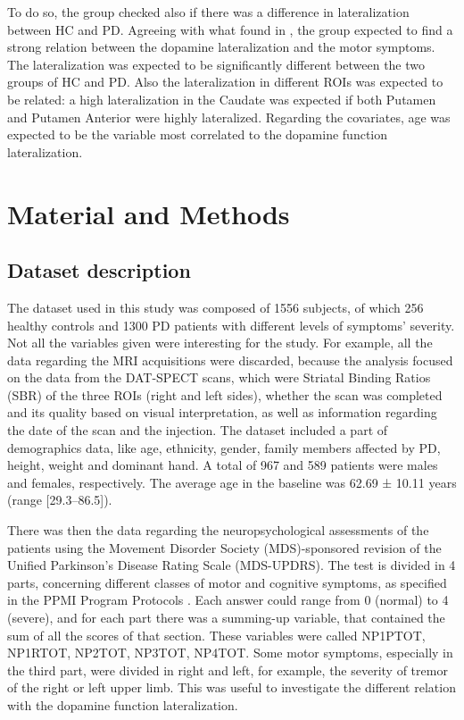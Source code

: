 \documentclass[]{article}
\begin{document}
\begin{multicols}{2}
To do so, the group checked also if there was a difference in lateralization between HC and PD. 
\newline
Agreeing with what found in \cite{pirker_correlation_2003}, the group expected to find a strong relation between the dopamine lateralization and the motor symptoms. The lateralization was expected to be significantly different between the two groups of HC and PD. Also the lateralization in different ROIs was expected to be related: a high lateralization in the Caudate was expected if both Putamen and Putamen Anterior were highly lateralized. Regarding the covariates, age was expected to be the variable most correlated to the dopamine function lateralization.

\section{Material and Methods}

\subsection{Dataset description}
The dataset used in this study was composed of 1556 subjects, of which 256 healthy controls and 1300 PD patients with different levels of symptoms' severity. Not all the variables given were interesting for the study. For example, all the data regarding the MRI acquisitions were discarded, because the analysis focused on the data from the DAT-SPECT scans, which were Striatal Binding Ratios (SBR) of the three ROIs (right and left sides), whether the scan was completed and its quality based on visual interpretation, as well as information regarding the date of the scan and the injection. 
\newline
The dataset included a part of demographics data, like age, ethnicity, gender, family members affected by PD, height, weight and dominant hand.
A total of 967 and 589 patients were males and females, respectively. The average age in the baseline was 62.69 ± 10.11 years (range [29.3–86.5]). 

There was then the data regarding the neuropsychological assessments of the patients using the Movement Disorder Society (MDS)-sponsored revision of the Unified Parkinson's Disease Rating Scale (MDS-UPDRS). The test is divided in 4 parts, concerning different classes of motor and cognitive symptoms, as specified in the PPMI Program Protocols \cite{marek_parkinsons_2018}. Each answer could range from 0 (normal) to 4 (severe), and for each part there was a summing-up variable, that contained the sum of all the scores of that section. These variables were called NP1PTOT, NP1RTOT, NP2TOT, NP3TOT, NP4TOT. Some motor symptoms, especially in the third part, were divided in right and left, for example, the severity of tremor of the right or left upper limb. This was useful to investigate the different relation with the dopamine function lateralization.
\newline


\end{multicols}
\end{document}
